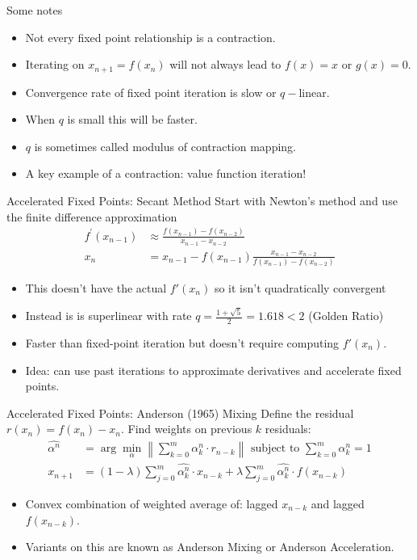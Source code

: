 \documentclass[xcolor=pdftex,dvipsnames,table,mathserif,aspectratio=169]{beamer}
\begin{document}
\begin{frame}{Some notes}
\begin{itemize}
\item Not every fixed point relationship is a contraction.
\item Iterating on $x_{n+1} = f(x_n)$ will not always lead to $f(x) = x$ or $g(x) =0$.
\item Convergence rate of fixed point iteration is \alert{slow} or $q-$linear.
\item When $q$ is small this will be faster.
\item $q$ is sometimes called \alert{modulus} of contraction mapping.
\item A key example of a contraction: \alert{value function iteration}!
\end{itemize}
\end{frame}

\begin{frame}{Accelerated Fixed Points: Secant Method}
Start with Newton's method and use the finite difference approximation
\begin{align*}
f^{\prime}\left(x_{n-1}\right)  &\approx \frac{f\left(x_{n-1}\right)-f\left(x_{n-2}\right)}{x_{n-1}-x_{n-2}} \\
x_{n}&=x_{n-1}-f\left(x_{n-1}\right) \frac{x_{n-1}-x_{n-2}}{f\left(x_{n-1}\right)-f\left(x_{n-2}\right)}
\end{align*}
\begin{itemize}
\item This doesn't have the actual $f'(x_n)$ so it isn't quadratically convergent
\item Instead is is superlinear with rate $q = \frac{1 + \sqrt{5}}{2}=1.618 < 2$ (Golden Ratio)
\item Faster than fixed-point iteration but doesn't require computing $f'(x_n)$.
\item Idea: can use past iterations to approximate derivatives and accelerate fixed points.
\end{itemize}
\end{frame}

\begin{frame}{Accelerated Fixed Points: Anderson (1965) Mixing}
Define the residual $r(x_n) = f(x_n) - x_n$. Find weights on previous $k$ residuals:
\begin{align*}
\widehat{\alpha^{n}} &= \arg \min_{\alpha} \left\|\sum_{k=0}^{m} \alpha_{k}^{n} \cdot r_{n-k}\right\| \text { subject to } \sum_{k=0}^{m} \alpha_{k}^{n}=1\\
x_{n+1}&=\left(1-\lambda\right) \sum_{j=0}^{m} \widehat{\alpha_{k}^{n}}\cdot x_{n-k}+\lambda \sum_{j=0}^{m}\widehat{\alpha_{k}^{n}}\cdot f\left(x_{n-k}\right)
\end{align*}
\begin{itemize}
\item Convex combination of weighted average of: lagged $x_{n-k}$ and lagged $f(x_{n-k})$.
\item Variants on this are known as \alert{Anderson Mixing} or \alert{Anderson Acceleration}.
\end{itemize}
\end{frame}
\end{document}
